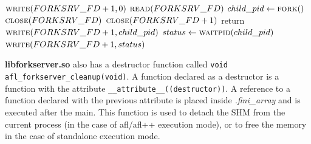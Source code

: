 \begin{algorithm}[h]
    \caption{AFL forkserver algorithm}
    \label{alg:afl_forkserver}
    \begin{algorithmic}
        \STATE $\textsc{write}(FORKSRV\_FD+1,0)$
            \STATE $\textsc{read}(FORKSRV\_FD)$
            \STATE $child\_pid \gets \textsc{fork}()$
                \STATE $\textsc{close}(FORKSRV\_FD)$ \COMMENT{\small \textcolor{green!60!black}{The child must return from the forkserver and execute the main, so the child process can close the file descriptors}}
                \STATE $\textsc{close}(FORKSRV\_FD+1)$
                \STATE $\text{return}$
            \ELSE
                \STATE $\textsc{write}(FORKSRV\_FD+1,child\_pid)$  \COMMENT{\small \textcolor{green!60!black}{Communicate the PID of the child to the fuzzer}}
                \STATE $status \gets \textsc{waitpid}(child\_pid)$
                \STATE $\textsc{write}(FORKSRV\_FD+1,status)$
            \ENDIF
        \ENDWHILE
    \end{algorithmic}
\end{algorithm}

\textbf{libforkserver.so} also has a destructor function called \texttt{void afl\_forkserver\_cleanup(void)}.
A function declared as a destructor is a function with the attribute \texttt{\_\_attribute\_\_((destructor))}.
A reference to a function declared with the previous attribute is placed inside \textit{.fini\_array} and is executed 
after the main.
This function is used to detach the \gls{SHM} from the current process (in the case of afl/afl++ execution mode), or to 
free the memory in the case of standalone execution mode.